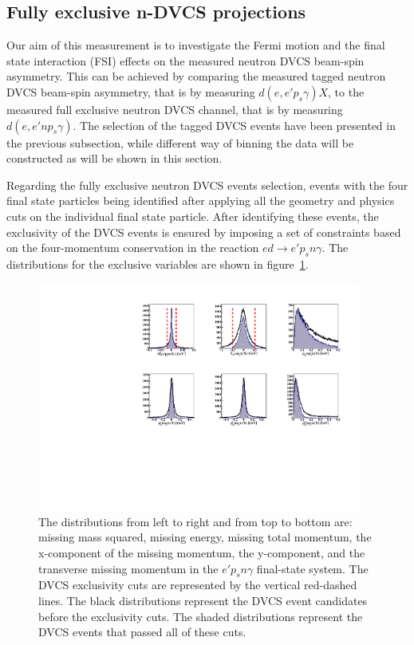 \subsection{Fully exclusive n-DVCS projections}
Our aim of this measurement is to investigate the Fermi motion and the final 
state interaction (FSI) effects on the measured neutron DVCS beam-spin 
asymmetry. This can be achieved by comparing the measured tagged neutron DVCS 
beam-spin asymmetry, that is by measuring $d(e,e'p_s\gamma)X$, to the measured 
full exclusive neutron DVCS channel, that is by measuring $d(e,e'np_s\gamma)$.  
The selection of the tagged DVCS events have been presented in the previous 
subsection, while different way of binning the data will be constructed as will 
be shown in this section. 

Regarding the fully exclusive neutron DVCS events selection, events with the 
four final state particles being identified after applying all the geometry and 
physics cuts on the individual final state particle. After identifying these 
events, the exclusivity of the DVCS events is ensured by imposing a set of 
constraints based on the four-momentum conservation in the reaction 
$ed\rightarrow e'p_{s}n\gamma$.  The distributions for the exclusive variables 
are shown in figure~\ref{fig:fully_exclusive}.

\begin{figure}[htb]
  \centering
    \includegraphics[width=0.95\textwidth,clip]{figs_epngamma/pdf/epngamma_all_incoh_exc_cuts.pdf}
  \caption{
    The distributions from left to right and from top to bottom are:
    missing mass squared, missing energy, missing total momentum, the 
    x-component of the missing momentum, the y-component, and the transverse 
    missing momentum in the $e'p_{s}n\gamma$ final-state system. The DVCS 
    exclusivity cuts are represented by the vertical red-dashed lines. The 
    black distributions represent the DVCS event candidates before the 
    exclusivity cuts. The shaded distributions represent the DVCS events that 
    passed all of these cuts.
   \label{fig:fully_exclusive}}
\end{figure}

